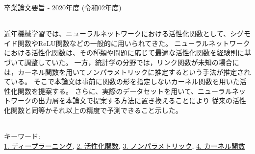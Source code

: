 卒業論文要旨 - 2020年度 (令和02年度)
\begin{center}
\begin{large}
\end{large}
\end{center}

~ \\



近年機械学習では、ニューラルネットワークにおける活性化関数として、シグモイド関数やReLU関数などの一般的に用いられてきた。
ニューラルネットワークにおける活性化関数は、その種類や問題に応じて最適な活性化関数を経験則に基づいて調整していた。
一方，統計学の分野では，リンク関数が未知の場合には，カーネル関数を用いてノンパラメトリックに推定するという手法が推定されている。
そこで本論文は事前に関数の形を指定しないカーネル関数を用いた活性化関数を提案する。
さらに、実際のデータセットを用いて、ニューラルネットワークの出力層を本論文で提案する方法に置き換えることにより
従来の活性化関数と同等かそれ以上の精度で予測できること示した。


~ \\
キーワード:\\
\underline{1. ディープラーニング},
\underline{2. 活性化関数},
\underline{3. ノンパラメトリック},
\underline{4. カーネル関数}
\begin{flushright}
\dept \\
\author
\end{flushright}
